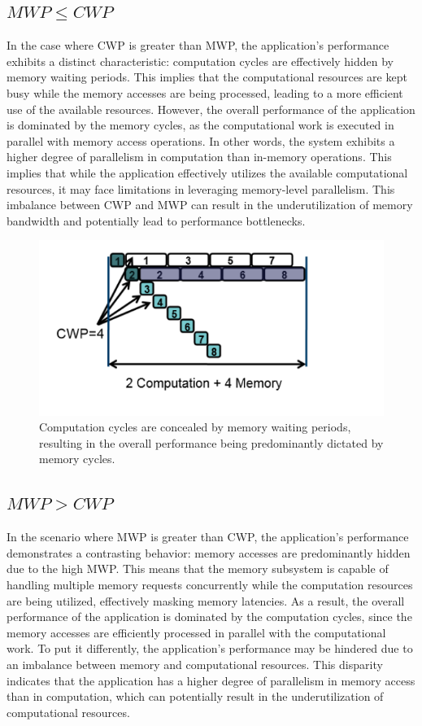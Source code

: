 \subsection{$MWP \leq CWP$}
\label{sec:mwp-cwp:1}

In the case where CWP is greater than MWP, the application's performance exhibits a distinct 
characteristic: computation cycles are effectively hidden by memory waiting periods. This implies 
that the computational resources are kept busy while the memory accesses are being processed, 
leading to a more efficient use of the available resources. However, the overall performance of 
the application is dominated by the memory cycles, as the computational work is executed in parallel 
with memory access operations. In other words, the system exhibits a higher degree of parallelism in 
computation than in-memory operations. This implies that while the application effectively utilizes 
the available computational resources, it may face limitations in leveraging memory-level parallelism. 
This imbalance between CWP and MWP can result in the underutilization of memory bandwidth and potentially 
lead to performance bottlenecks.\cite{DBLP:conf/isca/HongK09,marcmwpcwpslides}

\begin{figure}[htb]
    \centering
    \includegraphics[width=0.65\linewidth]{Figures/cwpgreaterthanmwp.png}
	\caption{Computation cycles are concealed by memory waiting periods, 
             resulting in the overall performance being predominantly dictated by memory cycles.}
	\label{fig:cwpgreaterthanmwp}
\end{figure}

\subsection{$MWP > CWP$}
\label{sec:mwp-cwp:2}

In the scenario where MWP is greater than CWP, the application's performance demonstrates a contrasting behavior: 
memory accesses are predominantly hidden due to the high MWP. This means that the memory subsystem is capable 
of handling multiple memory requests concurrently while the computation resources are being utilized, 
effectively masking memory latencies. As a result, the overall performance of the application is dominated 
by the computation cycles, since the memory accesses are efficiently processed in parallel with the computational 
work. To put it differently, the application's performance may be hindered due to an imbalance between memory 
and computational resources. This disparity indicates that the application has a higher degree of parallelism 
in memory access than in computation, which can potentially result in the underutilization of computational 
resources.\cite{DBLP:conf/isca/HongK09,marcmwpcwpslides}

